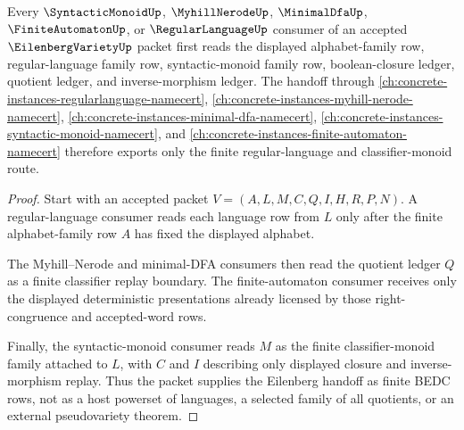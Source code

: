 \begin{theorem}
\label{thm:eilenberg-variety-syntactic-monoid-handoff}
Every $\SyntacticMonoidUp$, $\MyhillNerodeUp$, $\MinimalDfaUp$, $\FiniteAutomatonUp$, or $\RegularLanguageUp$ consumer of an accepted $\EilenbergVarietyUp$ packet first reads the displayed alphabet-family row, regular-language family row, syntactic-monoid family row, boolean-closure ledger, quotient ledger, and inverse-morphism ledger. The handoff through \autoref{ch:concrete-instances-regularlanguage-namecert}, \autoref{ch:concrete-instances-myhill-nerode-namecert}, \autoref{ch:concrete-instances-minimal-dfa-namecert}, \autoref{ch:concrete-instances-syntactic-monoid-namecert}, and \autoref{ch:concrete-instances-finite-automaton-namecert} therefore exports only the finite regular-language and classifier-monoid route.
\end{theorem}
\begin{proof}
Start with an accepted packet $V=(A,L,M,C,Q,I,H,R,P,N)$. A regular-language consumer reads each language row from $L$ only after the finite alphabet-family row $A$ has fixed the displayed alphabet.

The Myhill--Nerode and minimal-DFA consumers then read the quotient ledger $Q$ as a finite classifier replay boundary. The finite-automaton consumer receives only the displayed deterministic presentations already licensed by those right-congruence and accepted-word rows.

Finally, the syntactic-monoid consumer reads $M$ as the finite classifier-monoid family attached to $L$, with $C$ and $I$ describing only displayed closure and inverse-morphism replay. Thus the packet supplies the Eilenberg handoff as finite BEDC rows, not as a host powerset of languages, a selected family of all quotients, or an external pseudovariety theorem.
\end{proof}


